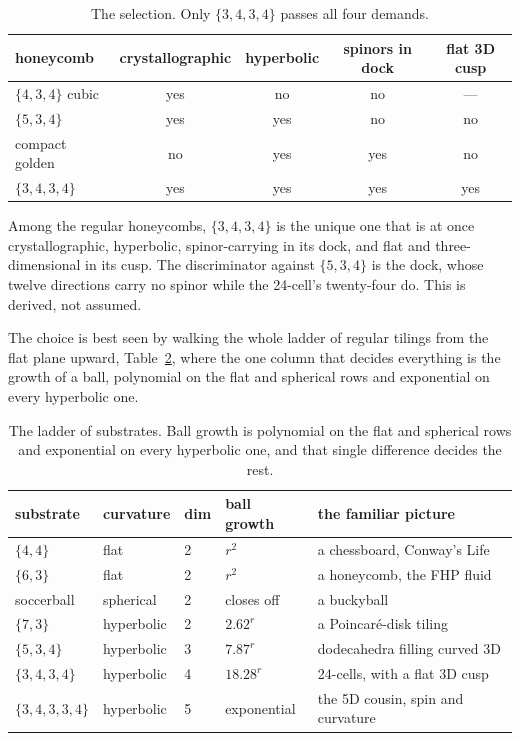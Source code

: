 \begin{table}[ht]
\centering
\begin{tabular}{@{}lcccc@{}}
\toprule
honeycomb & crystallographic & hyperbolic & spinors in dock & flat 3D cusp \\
\midrule
$\{4,3,4\}$ cubic & yes & no & no & --- \\
$\{5,3,4\}$ & yes & yes & no & no \\
compact golden & no & yes & yes & no \\
$\{3,4,3,4\}$ & yes & yes & yes & yes \\
\bottomrule
\end{tabular}
\caption{The selection. Only $\{3,4,3,4\}$ passes all four demands.}
\label{tab:selection}
\end{table}

\begin{result}[Selection of $\{3,4,3,4\}$]
Among the regular honeycombs, $\{3,4,3,4\}$ is the unique one that is at once crystallographic, hyperbolic, spinor-carrying in its dock, and flat and three-dimensional in its cusp. The discriminator against $\{5,3,4\}$ is the dock, whose twelve directions carry no spinor while the 24-cell's twenty-four do. This is derived, not assumed. \cite{pollard2026vibetest}
\end{result}

The choice is best seen by walking the whole ladder of regular tilings from the flat plane upward, Table~\ref{tab:ladder}, where the one column that decides everything is the growth of a ball, polynomial on the flat and spherical rows and exponential on every hyperbolic one.

\begin{table}[ht]
\centering
\begin{tabular}{@{}lllll@{}}
\toprule
substrate & curvature & dim & ball growth & the familiar picture \\
\midrule
$\{4,4\}$ & flat & 2 & $r^2$ & a chessboard, Conway's Life \\
$\{6,3\}$ & flat & 2 & $r^2$ & a honeycomb, the FHP fluid \\
soccerball & spherical & 2 & closes off & a buckyball \\
$\{7,3\}$ & hyperbolic & 2 & $2.62^r$ & a Poincar\'e-disk tiling \\
$\{5,3,4\}$ & hyperbolic & 3 & $7.87^r$ & dodecahedra filling curved 3D \\
$\{3,4,3,4\}$ & hyperbolic & 4 & $18.28^r$ & 24-cells, with a flat 3D cusp \\
$\{3,4,3,3,4\}$ & hyperbolic & 5 & exponential & the 5D cousin, spin and curvature \\
\bottomrule
\end{tabular}
\caption{The ladder of substrates. Ball growth is polynomial on the flat and spherical rows and exponential on every hyperbolic one, and that single difference decides the rest.}
\label{tab:ladder}
\end{table}

